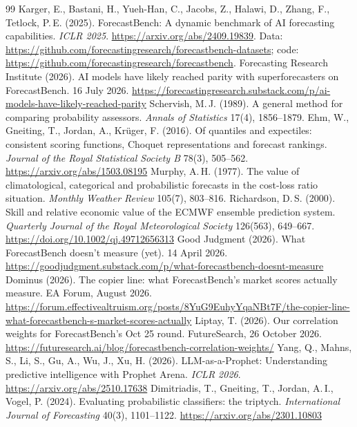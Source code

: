 \documentclass[10pt]{article}
\begin{document}
\begin{thebibliography}{99}\small
\setlength{\itemsep}{.1ex}
 Karger, E., Bastani, H., Yueh-Han, C., Jacobs, Z., Halawi, D., Zhang, F., Tetlock, P.\,E. (2025). ForecastBench: A dynamic benchmark of AI forecasting capabilities. \emph{ICLR 2025}. \url{https://arxiv.org/abs/2409.19839}. Data: \url{https://github.com/forecastingresearch/forecastbench-datasets}; code: \url{https://github.com/forecastingresearch/forecastbench}.
 Forecasting Research Institute (2026). AI models have likely reached parity with superforecasters on ForecastBench. 16 July 2026. \url{https://forecastingresearch.substack.com/p/ai-models-have-likely-reached-parity}
 Schervish, M.\,J. (1989). A general method for comparing probability assessors. \emph{Annals of Statistics} 17(4), 1856--1879.
 Ehm, W., Gneiting, T., Jordan, A., Kr\"uger, F. (2016). Of quantiles and expectiles: consistent scoring functions, Choquet representations and forecast rankings. \emph{Journal of the Royal Statistical Society B} 78(3), 505--562. \url{https://arxiv.org/abs/1503.08195}
 Murphy, A.\,H. (1977). The value of climatological, categorical and probabilistic forecasts in the cost-loss ratio situation. \emph{Monthly Weather Review} 105(7), 803--816.
 Richardson, D.\,S. (2000). Skill and relative economic value of the ECMWF ensemble prediction system. \emph{Quarterly Journal of the Royal Meteorological Society} 126(563), 649--667. \url{https://doi.org/10.1002/qj.49712656313}
 Good Judgment (2026). What ForecastBench doesn't measure (yet). 14 April 2026. \url{https://goodjudgment.substack.com/p/what-forecastbench-doesnt-measure}
 Dominus (2026). The copier line: what ForecastBench's market scores actually measure. EA Forum, August 2026. \url{https://forum.effectivealtruism.org/posts/8YuG9EuhyYqaNBt7F/the-copier-line-what-forecastbench-s-market-scores-actually}
 Liptay, T. (2026). Our correlation weights for ForecastBench's Oct 25 round. FutureSearch, 26 October 2026. \url{https://futuresearch.ai/blog/forecastbench-correlation-weights/}
 Yang, Q., Mahns, S., Li, S., Gu, A., Wu, J., Xu, H. (2026). LLM-as-a-Prophet: Understanding predictive intelligence with Prophet Arena. \emph{ICLR 2026}. \url{https://arxiv.org/abs/2510.17638}
 Dimitriadis, T., Gneiting, T., Jordan, A.\,I., Vogel, P. (2024). Evaluating probabilistic classifiers: the triptych. \emph{International Journal of Forecasting} 40(3), 1101--1122. \url{https://arxiv.org/abs/2301.10803}

\end{thebibliography}
\end{document}

